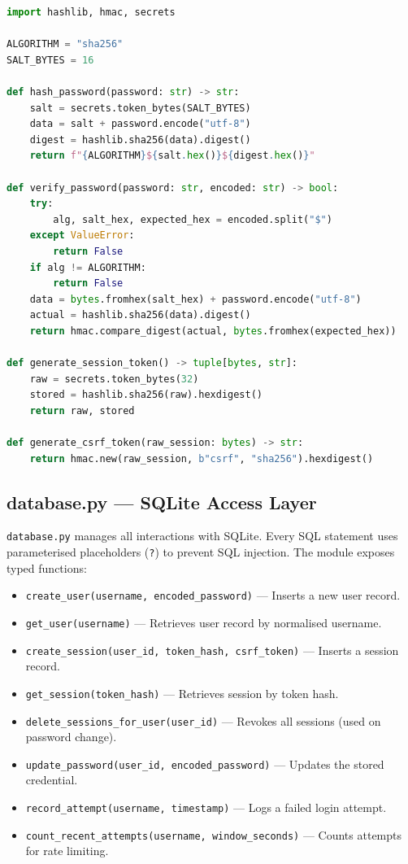 \begin{lstlisting}[language=Python,caption={Core cryptographic functions in security.py},label={lst:security}]
import hashlib, hmac, secrets

ALGORITHM = "sha256"
SALT_BYTES = 16

def hash_password(password: str) -> str:
    salt = secrets.token_bytes(SALT_BYTES)
    data = salt + password.encode("utf-8")
    digest = hashlib.sha256(data).digest()
    return f"{ALGORITHM}${salt.hex()}${digest.hex()}"

def verify_password(password: str, encoded: str) -> bool:
    try:
        alg, salt_hex, expected_hex = encoded.split("$")
    except ValueError:
        return False
    if alg != ALGORITHM:
        return False
    data = bytes.fromhex(salt_hex) + password.encode("utf-8")
    actual = hashlib.sha256(data).digest()
    return hmac.compare_digest(actual, bytes.fromhex(expected_hex))

def generate_session_token() -> tuple[bytes, str]:
    raw = secrets.token_bytes(32)
    stored = hashlib.sha256(raw).hexdigest()
    return raw, stored

def generate_csrf_token(raw_session: bytes) -> str:
    return hmac.new(raw_session, b"csrf", "sha256").hexdigest()
\end{lstlisting}

\subsection{database.py --- SQLite Access Layer}
\label{sec:impl_database}

\texttt{database.py} manages all interactions with SQLite. Every SQL statement uses parameterised placeholders (\texttt{?}) to prevent SQL injection. The module exposes typed functions:

\begin{itemize}
  \item \texttt{create\_user(username, encoded\_password)} --- Inserts a new user record.
  \item \texttt{get\_user(username)} --- Retrieves user record by normalised username.
  \item \texttt{create\_session(user\_id, token\_hash, csrf\_token)} --- Inserts a session record.
  \item \texttt{get\_session(token\_hash)} --- Retrieves session by token hash.
  \item \texttt{delete\_sessions\_for\_user(user\_id)} --- Revokes all sessions (used on password change).
  \item \texttt{update\_password(user\_id, encoded\_password)} --- Updates the stored credential.
  \item \texttt{record\_attempt(username, timestamp)} --- Logs a failed login attempt.
  \item \texttt{count\_recent\_attempts(username, window\_seconds)} --- Counts attempts for rate limiting.
\end{itemize}

